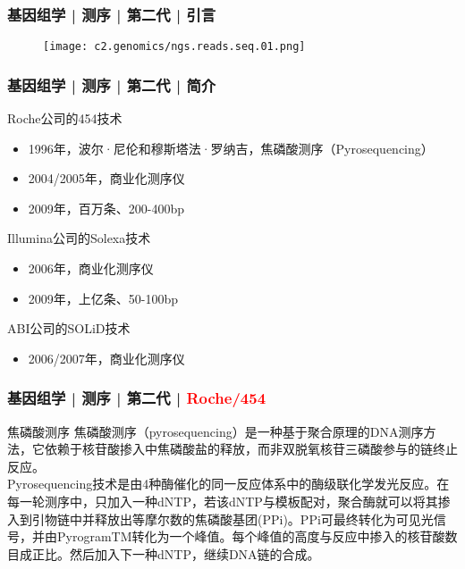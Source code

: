 \begin{frame}
  \frametitle{基因组学 | 测序 | 第二代 | 引言}
  \begin{figure}
    \centering
    \texttt{[image: c2.genomics/ngs.reads.seq.01.png]}
  \end{figure}
\end{frame}

\begin{frame}
  \frametitle{基因组学 | 测序 | 第二代 | 简介}
  \begin{block}{Roche公司的454技术}
  \begin{itemize}
    \item 1996年，波尔·尼伦和穆斯塔法·罗纳吉，焦磷酸测序（Pyrosequencing）
    \item 2004/2005年，商业化测序仪
    \item 2009年，百万条、200-400bp
  \end{itemize}
  \end{block}
  \pause
  \begin{block}{Illumina公司的Solexa技术}
  \begin{itemize}
    \item 2006年，商业化测序仪
    \item 2009年，上亿条、50-100bp
  \end{itemize}
  \end{block}
  \pause
  \begin{block}{ABI公司的SOLiD技术}
  \begin{itemize}
    \item 2006/2007年，商业化测序仪
  \end{itemize}
  \end{block}
\end{frame}

\begin{frame}
  \frametitle{基因组学 | 测序 | 第二代 | \textcolor{red}{Roche/454}}
  \begin{block}{焦磷酸测序}
焦磷酸测序（pyrosequencing）是一种基于聚合原理的DNA测序方法，它依赖于核苷酸掺入中焦磷酸盐的释放，而非双脱氧核苷三磷酸参与的链终止反应。\\
\vspace{1em}
Pyrosequencing技术是由4种酶催化的同一反应体系中的酶级联化学发光反应。在每一轮测序中，只加入一种dNTP，若该dNTP与模板配对，聚合酶就可以将其掺入到引物链中并释放出等摩尔数的焦磷酸基团(PPi)。PPi可最终转化为可见光信号，并由PyrogramTM转化为一个峰值。每个峰值的高度与反应中掺入的核苷酸数目成正比。然后加入下一种dNTP，继续DNA链的合成。
  \end{block}
\end{frame}

